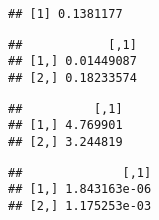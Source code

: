 \documentclass[
]{article}
\newenvironment{Shaded}{\begin{snugshade}}{\end{snugshade}}
\newcommand{\FunctionTok}[1]{\textcolor[rgb]{0.13,0.29,0.53}{\textbf{#1}}}
\newcommand{\NormalTok}[1]{#1}
\newcommand{\OtherTok}[1]{\textcolor[rgb]{0.56,0.35,0.01}{#1}}
\newcommand{\SpecialCharTok}[1]{\textcolor[rgb]{0.81,0.36,0.00}{\textbf{#1}}}
\begin{document}
\begin{verbatim}
## [1] 0.1381177
\end{verbatim}

\begin{Shaded}
\end{Shaded}

\begin{verbatim}
##            [,1]
## [1,] 0.01449087
## [2,] 0.18233574
\end{verbatim}

\begin{Shaded}
\end{Shaded}

\begin{verbatim}
##          [,1]
## [1,] 4.769901
## [2,] 3.244819
\end{verbatim}

\begin{Shaded}
\end{Shaded}

\begin{verbatim}
##              [,1]
## [1,] 1.843163e-06
## [2,] 1.175253e-03
\end{verbatim}
\end{document}
